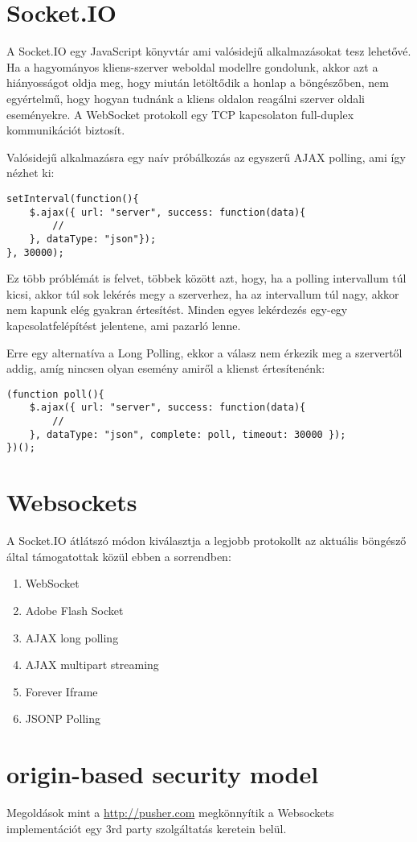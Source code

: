\section{Socket.IO}
A Socket.IO egy JavaScript könyvtár ami valósidejű alkalmazásokat tesz lehetővé. Ha a hagyományos kliens-szerver weboldal modellre gondolunk, akkor azt a hiányosságot oldja meg, hogy miután letöltődik a honlap a böngészőben, nem egyértelmű, hogy hogyan tudnánk a kliens oldalon reagálni szerver oldali eseményekre. A WebSocket protokoll egy TCP kapcsolaton full-duplex kommunikációt biztosít.

Valósidejű alkalmazásra egy naív próbálkozás az egyszerű AJAX polling, ami így nézhet ki:
\medskip
\begin{lstlisting}[caption=Egyszerű polling]
setInterval(function(){
    $.ajax({ url: "server", success: function(data){
        //
    }, dataType: "json"});
}, 30000);
\end{lstlisting}

Ez több próblémát is felvet, többek között azt, hogy, ha a polling intervallum túl kicsi, akkor túl sok lekérés megy a szerverhez, ha az intervallum túl nagy, akkor nem kapunk elég gyakran értesítést. Minden egyes lekérdezés egy-egy kapcsolatfelépítést jelentene, ami pazarló lenne.

Erre egy alternatíva a Long Polling, ekkor a válasz nem érkezik meg a szervertől addig, amíg nincsen olyan esemény amiről a klienst értesítenénk:

\begin{lstlisting}[caption=Long Polling]
(function poll(){
    $.ajax({ url: "server", success: function(data){
        // 
    }, dataType: "json", complete: poll, timeout: 30000 });
})();
\end{lstlisting}


\section{Websockets}





A Socket.IO átlátszó módon kiválasztja a legjobb protokollt az aktuális böngésző által támogatottak közül ebben a sorrendben:
\begin{enumerate}
\item{WebSocket}
\item{Adobe Flash Socket}
\item{AJAX long polling}
\item{AJAX multipart streaming}
\item{Forever Iframe}
\item{JSONP Polling}
\end{enumerate}

\section{origin-based security model}

Megoldások mint a \url{http://pusher.com} megkönnyítik a Websockets implementációt egy 3rd party szolgáltatás keretein belül.

